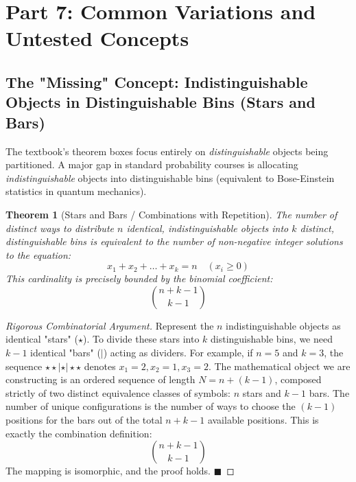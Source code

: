 \documentclass[11pt]{article}
\theoremstyle{definition}
\theoremstyle{plain}
\newtheorem{theorem}{Theorem}[section]
\theoremstyle{remark}
\begin{document}
\newpage
\section{Part 7: Common Variations and Untested Concepts}
\subsection{The "Missing" Concept: Indistinguishable Objects in Distinguishable Bins (Stars and Bars)}
The textbook's theorem boxes focus entirely on \textit{distinguishable} objects being partitioned. A major gap in standard probability courses is allocating \textit{indistinguishable} objects into distinguishable bins (equivalent to Bose-Einstein statistics in quantum mechanics).

\begin{theorem}[Stars and Bars / Combinations with Repetition]
The number of distinct ways to distribute $n$ identical, indistinguishable objects into $k$ distinct, distinguishable bins is equivalent to the number of non-negative integer solutions to the equation:
\[
x_1 + x_2 + \dots + x_k = n \quad (x_i \ge 0)
\]
This cardinality is precisely bounded by the binomial coefficient:
\[
\binom{n+k-1}{k-1}
\]
\end{theorem}

\begin{proof}[Rigorous Combinatorial Argument]
Represent the $n$ indistinguishable objects as identical "stars" ($\star$). To divide these stars into $k$ distinguishable bins, we need $k-1$ identical "bars" ($|$) acting as dividers. 
For example, if $n=5$ and $k=3$, the sequence $\star \star | \star | \star \star$ denotes $x_1=2, x_2=1, x_3=2$. 
The mathematical object we are constructing is an ordered sequence of length $N = n + (k-1)$, composed strictly of two distinct equivalence classes of symbols: $n$ stars and $k-1$ bars. 
The number of unique configurations is the number of ways to choose the $(k-1)$ positions for the bars out of the total $n+k-1$ available positions. This is exactly the combination definition:
\[
\binom{n+k-1}{k-1}
\]
The mapping is isomorphic, and the proof holds. $\blacksquare$
\end{proof}

\end{document}
